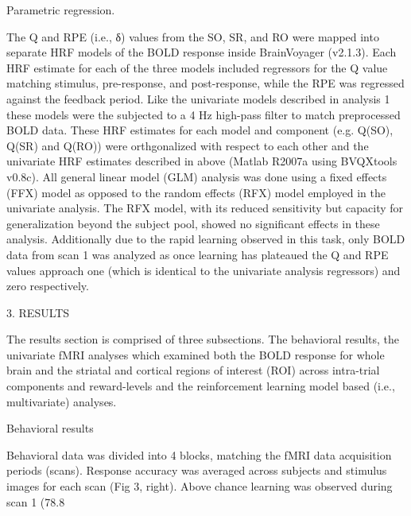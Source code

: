   

Parametric regression.  

The Q and RPE (i.e., δ) values from the SO, SR, and RO were mapped into separate HRF models of the BOLD response inside BrainVoyager (v2.1.3).  Each HRF estimate for each of the three models included regressors for the Q value matching stimulus, pre-response, and post-response, while the RPE was regressed against the feedback period.  Like the univariate models described in analysis 1 these models were the subjected to a 4 Hz high-pass filter to match preprocessed BOLD data.  These HRF estimates for each model and component (e.g. Q(SO), Q(SR) and Q(RO)) were orthgonalized with respect to each other and the univariate HRF estimates described in above (Matlab R2007a using BVQXtools v0.8c).  All general linear model (GLM) analysis was done using a fixed effects (FFX) model as opposed to the random effects (RFX) model employed in the univariate analysis.  The RFX model, with its reduced sensitivity but capacity for generalization beyond the subject pool, showed no significant effects in these analysis.  Additionally due to the rapid learning observed in this task, only BOLD data from scan 1 was analyzed as once learning has plateaued the Q and RPE values approach one (which is identical to the univariate analysis regressors) and zero respectively.    



 

3. RESULTS



The results section is comprised of three subsections.  The behavioral results, the univariate fMRI analyses which examined both the BOLD response for whole brain and the striatal and cortical regions of interest (ROI) across intra-trial components and reward-levels and the reinforcement learning model based (i.e., multivariate) analyses.



Behavioral results  

Behavioral data was divided into 4 blocks, matching the fMRI data acquisition periods (scans).  Response accuracy was averaged across subjects and stimulus images for each scan (Fig 3, right).  Above chance learning was observed during scan 1 (78.8 %



